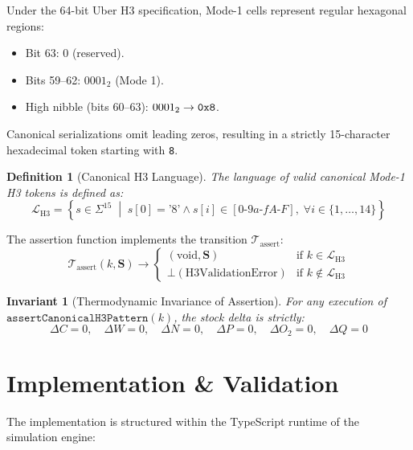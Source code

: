 \documentclass[11pt,a4paper]{article}
\newtheorem{definition}{Definition}
\newtheorem{invariant}{Invariant}
\begin{document}
Under the 64-bit Uber H3 specification, Mode-1 cells represent regular hexagonal regions:
\begin{itemize}
    \item Bit 63: 0 (reserved).
    \item Bits 59--62: $0001_2$ (Mode 1).
    \item High nibble (bits 60--63): $0001_2 \to \text{\texttt{0x8}}$.
\end{itemize}

Canonical serializations omit leading zeros, resulting in a strictly 15-character hexadecimal token starting with \texttt{8}.

\begin{definition}[Canonical H3 Language]
The language of valid canonical Mode-1 H3 tokens is defined as:
\begin{equation}
\mathcal{L}_{\text{H3}} = \left\{ s \in \Sigma^{15} \;\middle|\; s[0] = \text{'8'} \land s[i] \in [0\text{-}9a\text{-}fA\text{-}F], \; \forall i \in \{1, \dots, 14\} \right\}
\end{equation}
\end{definition}

The assertion function implements the transition $\mathcal{T}_{\text{assert}}$:
\begin{equation}
\mathcal{T}_{\text{assert}}(k, \mathbf{S}) \to \begin{cases}
(\text{void}, \mathbf{S}) & \text{if } k \in \mathcal{L}_{\text{H3}} \\
\bot (\text{H3ValidationError}) & \text{if } k \notin \mathcal{L}_{\text{H3}}
\end{cases}
\end{equation}

\begin{invariant}[Thermodynamic Invariance of Assertion]
For any execution of $\texttt{assertCanonicalH3Pattern}(k)$, the stock delta is strictly:
\begin{equation}
\Delta C = 0, \quad \Delta W = 0, \quad \Delta N = 0, \quad \Delta P = 0, \quad \Delta O_2 = 0, \quad \Delta Q = 0
\end{equation}
\end{invariant}

\section{Implementation \& Validation}

The implementation is structured within the TypeScript runtime of the simulation engine:
\end{document}
